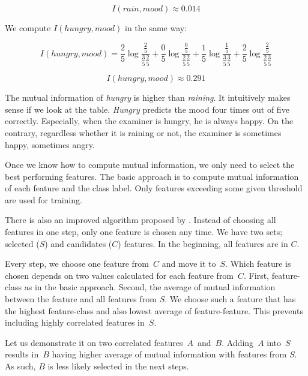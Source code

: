 \begin{equation}
	I(\mathit{rain}, \mathit{mood}) \approx 0.014
\end{equation}

We compute $I(\mathit{hungry}, \mathit{mood})$ in the same way:

\begin{equation}
	I(\mathit{hungry}, \mathit{mood}) =
	\frac{2}{5}
		\log \frac{
	\frac{2}{5}
	}{
	\frac{3}{5}
	\frac{2}{5}
	} +
%
	\frac{0}{5}
		\log \frac{
	\frac{0}{5}
	}{
	\frac{2}{5}
	\frac{2}{5}
	} +
%
	\frac{1}{5}
		\log \frac{
	\frac{1}{5}
	}{
	\frac{3}{5}
	\frac{3}{5}
	} +
%
	\frac{2}{5}
		\log \frac{
	\frac{2}{5}
	}{
	\frac{2}{5}
	\frac{3}{5}
	}
\end{equation}

\begin{equation}
	I(\mathit{hungry}, \mathit{mood}) \approx 0.291
\end{equation}

The mutual information of \textit{hungry} is higher than \textit{raining}.
It intuitively makes sense if we look at the table.
\textit{Hungry} predicts the mood four times out of five correctly.
Especially, when the examiner is hungry, he is always happy.
On the contrary, regardless whether it is raining or not, the examiner
is sometimes happy, sometimes angry.

Once we know how to compute mutual information,
we only need to select the best performing features.
The basic approach is to compute mutual information of each feature and the class label.
Only features exceeding some given threshold are used for training.

There is also an improved algorithm proposed by \citet{Hoq14}.
Instead of choosing all features in one step,
only one feature is chosen any time.
We have two sets; selected ($S$) and candidates ($C$) features.
In the beginning, all features are in $C$.

Every step, we choose one feature from~$C$ and move it to~$S$.
Which feature is chosen depends on two values calculated for each feature from~$C$.
First, feature-class as in the basic approach.
Second, the average of mutual information between the feature and all features from $S$.
We choose such a feature that has the highest feature-class and also lowest average of feature-feature.
This prevents including highly correlated features in~$S$.

Let us demonstrate it on two correlated features~$A$~and~$B$.
Adding~$A$ into~$S$ results in~$B$ having higher average of mutual information with features from $S$.
As such, $B$ is less likely selected in the next steps.

